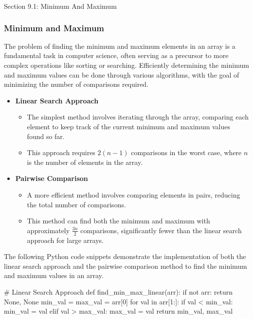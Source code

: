 \begin{notes}{Section 9.1: Minimum And Maximum}
    \subsubsection*{Minimum and Maximum}

    The problem of finding the minimum and maximum elements in an array is a fundamental task in computer science, often serving as a precursor to more complex operations like sorting or searching. 
    Efficiently determining the minimum and maximum values can be done through various algorithms, with the goal of minimizing the number of comparisons required.
    
    \begin{itemize}
        \item \textbf{Linear Search Approach}
        \begin{itemize}
            \item The simplest method involves iterating through the array, comparing each element to keep track of the current minimum and maximum values found so far.
            \item This approach requires $2(n-1)$ comparisons in the worst case, where $n$ is the number of elements in the array.
        \end{itemize}
        
        \item \textbf{Pairwise Comparison}
        \begin{itemize}
            \item A more efficient method involves comparing elements in pairs, reducing the total number of comparisons.
            \item This method can find both the minimum and maximum with approximately $\frac{3n}{2}$ comparisons, significantly fewer than the linear search approach for large arrays.
        \end{itemize}
    \end{itemize}
    
    \begin{highlight}
        The following Python code snippets demonstrate the implementation of both the linear search approach and the pairwise comparison method to find the minimum and maximum values in an array.
    \begin{code}[Python]
    # Linear Search Approach
    def find_min_max_linear(arr):
        if not arr:
            return None, None
        min_val = max_val = arr[0]
        for val in arr[1:]:
            if val < min_val:
                min_val = val
            elif val > max_val:
                max_val = val
        return min_val, max_val
    

\end{code}
\end{highlight}
\end{notes}
